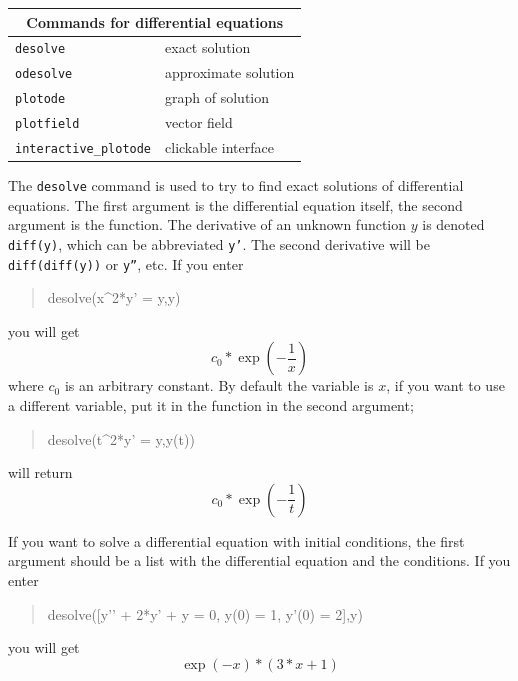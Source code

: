 \documentclass{article}
\newcommand{\xcasin}[1]
{\begin{quote}\ttfamily
#1
\end{quote}}
\newcommand{\xcasout}[1]
{\begin{equation*}
#1
\end{equation*}}
\begin{document}
\begin{center}
\begin{tabular}{|p{}|p{}|}
\hline
\multicolumn{2}{|c|}{\textbf{Commands for differential equations}}\\
\hline\hline
\texttt{desolve} & exact solution\\
\texttt{odesolve} & approximate solution\\
\texttt{plotode} & graph of solution\\
\texttt{plotfield} & vector field\\
\texttt{interactive\_plotode} & clickable interface\\
\hline
\end{tabular}
\end{center}

The \texttt{desolve} command is used to try to find exact solutions of
differential equations.  The first argument is the differential
equation itself, the second argument is the function.  The derivative
of an unknown function $y$ is denoted \texttt{diff(y)}, which can be
abbreviated \texttt{y'}.  The second derivative will be
\texttt{diff(diff(y))} or \texttt{y''}, etc.
If you enter
\xcasin{desolve(x\^{}2*y' = y,y)}
you will get
\xcasout{c_0 * \exp(-\frac{1}{x})}
where $c_0$ is an arbitrary constant.  By default the variable is $x$,
if you want to use a different variable, put it in the function in the
second argument;
\xcasin{desolve(t\^{}2*y' = y,y(t))}
will return
\xcasout{c_0 * \exp(-\frac{1}{t})}

If you want to solve a differential equation with initial conditions,
the first argument should be a list with the differential equation and
the conditions.  If you enter
\xcasin{desolve([y'{}' + 2*y' + y = 0, y(0) = 1, y'(0) = 2],y)}
you will get
\xcasout{\exp(-x)*(3*x+1)}
\end{document}

